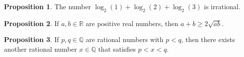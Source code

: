 \documentclass[11pt]{article}
\theoremstyle{definition}
\theoremstyle{theorem}
\newtheorem{proposition}{Proposition}
\begin{document}
\begin{proposition}%
  The number $\log_2(1) + \log_2(2) + \log_2(3)$ is irrational.
\end{proposition}

\begin{proposition}%
   If $a, b \in \mathbb{R}$ are positive real numbers, then $a+b \geq 2\sqrt{ab}$.
\end{proposition}

\begin{proposition}%
   If $p, q \in \mathbb{Q}$ are rational numbers with $p < q$, then there exists another rational number $x \in \mathbb{Q}$ that
  satisfies $p < x <  q$.
\end{proposition}
\end{document}

